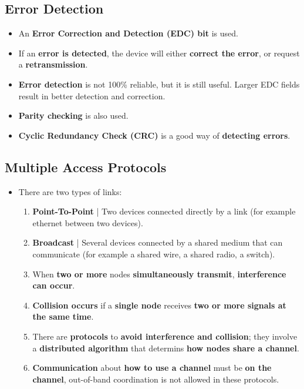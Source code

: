 \documentclass{article}
\begin{document}
    \subsection*{Error Detection}
    \begin{itemize}
        \item An \textbf{Error Correction and Detection (EDC) bit} is used.
        \item If an \textbf{error is detected}, the device will either \textbf{correct the error}, or request a \textbf{retransmission}.
        \item \textbf{Error detection} is not 100\% reliable, but it is still useful. Larger EDC fields result in better detection and correction.
        \item \textbf{Parity checking} is also used.
        \item \textbf{Cyclic Redundancy Check (CRC)} is a good way of \textbf{detecting errors}.
    \end{itemize}

    \subsection*{Multiple Access Protocols}
    \begin{itemize}
        \item There are two types of links:
        \begin{enumerate}
            \item \textbf{Point-To-Point} | Two devices connected directly by a link (for example ethernet between two devices).
            \item \textbf{Broadcast} | Several devices connected by a shared medium that can communicate (for example a shared wire, a shared radio, a switch).
            \item When \textbf{two or more} nodes \textbf{simultaneously transmit}, \textbf{interference can occur}.
            \item \textbf{Collision occurs} if a \textbf{single node} receives \textbf{two or more signals at the same time}.
            \item There are \textbf{protocols} to \textbf{avoid interference and collision}; they involve a \textbf{distributed algorithm} that determins \textbf{how nodes share a channel}.
            \item \textbf{Communication} about \textbf{how to use a channel} must be \textbf{on the channel}, out-of-band coordination is not allowed in these protocols.
        \end{enumerate}
    \end{itemize}
\end{document}
